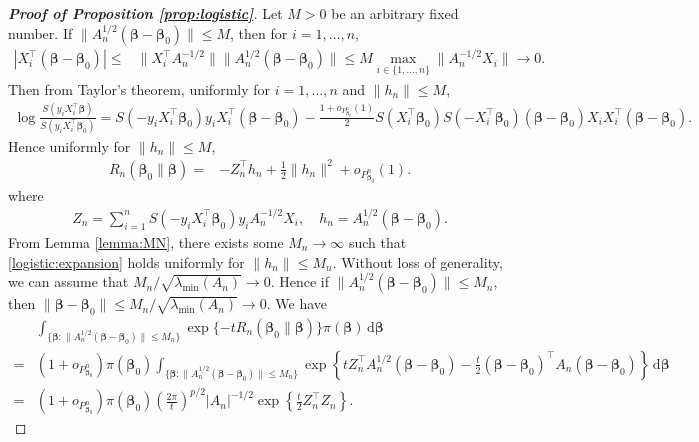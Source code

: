 \documentclass[11pt]{article}
\newcommand{\myT}{\intercal}
\newcommand{\bfsym}[1]{\ensuremath{\boldsymbol{#1}}}
\def\bbeta{\bfsym \beta}
\theoremstyle{plain}
\theoremstyle{definition}
\theoremstyle{remark}
\begin{document}
\begin{proof}[\textbf{Proof of Proposition \ref{prop:logistic}}]

Let $M>0$ be an arbitrary fixed number.
If $\|A_n^{1/2}(\bbeta - \bbeta_0)\| \leq M$, then for $i = 1, \dots, n$,
\begin{align*}
|X_i^\myT (\bbeta - \bbeta_0)| 
\leq& \|X_i^\myT  A_n^{-1/2} \|  \| A_n^{1/2} (\bbeta - \bbeta_0) \|
\leq 
M
\max_{i\in \{1,\dots, n\}}\| A_n^{-1/2} X_i \|
\to 0
.
\end{align*}
Then from Taylor's theorem, uniformly for $i=1,\dots,n$ and $\|h_n\| \leq M$,
\begin{align*}
    \log \frac{S(y_i X_i^\myT \bbeta)}{S(y_i X_i^\myT \bbeta_0)}
    = S(-y_i X_i^\myT \bbeta_0)  y_i X_i^\myT (\bbeta - \bbeta_0)
    -\frac{1 + o_{P_{\bbeta_0}^n}(1)}{2} 
    S( X_i^\myT \bbeta_0)
    S(- X_i^\myT \bbeta_0)
(\bbeta - \bbeta_0)
X_i
X_i^\myT (\bbeta - \bbeta_0)
.
\end{align*}
Hence uniformly for $\|h_n\| \leq M$,
\begin{align}\label{logistic:expansion}
    R_n(\bbeta_0 \| \bbeta)
=&
-Z_n^{\myT} h_n
    +\frac{1 }{2} 
    \|h_n \|^2
    +o_{P_{\bbeta_0}^n}(1)
.
\end{align}
where
\begin{align*}
 Z_n = 
    \sum_{i=1}^n 
 S(-y_i X_i^\myT \bbeta_0) 
  y_i
 A_n^{-1/2}
 X_i
 ,\quad
 h_n =
 A_n^{1/2} (\bbeta - \bbeta_0)
 .
\end{align*}
From Lemma \ref{lemma:MN}, there exists some $M_n \to \infty$ such that \eqref{logistic:expansion} holds uniformly for $\|h_n\| \leq M_n$.
Without loss of generality, we can assume that $M_n / \sqrt{\lambda_{\min}(A_n)} \to 0$.
Hence if $\|A_n^{1/2}(\bbeta - \bbeta_0)\| \leq M_n$, then $\|\bbeta - \bbeta_0\| \leq M_n / \sqrt{\lambda_{\min}(A_n)} \to 0$.
We have
\begin{align*}
    &
    \int_{\{\bbeta : \|A_n^{1/2}(\bbeta - \bbeta_0)\| \leq M_n \}} 
    \exp\{-t R_n (\bbeta_0 \| \bbeta)\} \pi(\bbeta) \, \mathrm d \bbeta
    \\
    =&
(1+o_{P_{\bbeta_0}^n})\pi(\bbeta_0)
    \int_{\{\bbeta : \|A_n^{1/2}(\bbeta - \bbeta_0)\| \leq M_n \}} 
    \exp\left\{t Z_n^\myT A_n^{1/2} (\bbeta - \bbeta_0) - \frac{t}{2}(\bbeta - \bbeta_0)^\myT A_n (\bbeta - \bbeta_0)  \right\}  \, \mathrm d \bbeta
    \\
    =&
(1+o_{P_{\bbeta_0}^n})\pi(\bbeta_0)
\left( \frac {2\pi}{t} \right)^{p/2} |A_n|^{-1/2} \exp \left\{\frac{t}{2} Z_n^\myT Z_n \right\}.
\end{align*}




\end{proof}
\end{document}
